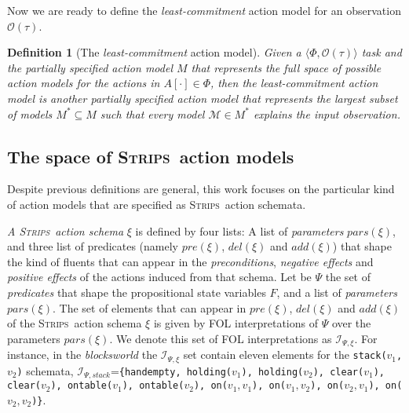 \documentclass{article}
\newcommand{\tup}[1]{{\langle #1 \rangle}}
\newcommand{\strips}{\textsc{Strips}}
\newtheorem{definition}[theorem]{Definition}
\begin{document}
Now we are ready to define the {\em least-commitment} action model for an observation $\mathcal{O}(\tau)$.
\begin{definition}[The {\em least-commitment} action model]
Given a $\tup{\Phi,\mathcal{O}(\tau)}$ task and the {\em partially specified action model} $M$ that represents the full space of possible action models for the actions in $A[\cdot]\in \Phi$, then the {\em least-commitment} action model is another {\em partially specified action model} that represents the largest subset of models $M^*\subseteq M$ such that every model $\mathcal{M}\in M^*$ {\em explains} the input observation.
\end{definition}

\subsection{The space of \strips\ action models}
Despite previous definitions are general, this work focuses on the particular kind of action models that are specified as \strips\ action schemata. 

{\em A \strips\ action schema} $\xi$ is defined by four lists: A list of {\em parameters} $pars(\xi)$, and three list of predicates (namely $pre(\xi)$, $del(\xi)$ and $add(\xi)$) that shape the kind of fluents that can appear in the {\em preconditions}, {\em negative effects} and {\em positive effects} of the actions induced from that schema. Let be $\Psi$ the set of {\em predicates} that shape the propositional state variables $F$, and a list of {\em parameters} $pars(\xi)$. The set of elements that can appear in $pre(\xi)$, $del(\xi)$ and $add(\xi)$ of the \strips\ action schema $\xi$ is given by FOL interpretations of $\Psi$ over the parameters $pars(\xi)$. We denote this set of FOL interpretations as ${\mathcal I}_{\Psi,\xi}$. For instance, in the {\em blocksworld} the ${\mathcal I}_{\Psi,\xi}$ set contain eleven elements for the {\small \tt stack($v_1$,$v_2$)} schemata, ${\mathcal I}_{\Psi,stack}$={\small\tt\{handempty, holding($v_1$), holding($v_2$), clear($v_1$), clear($v_2$), ontable($v_1$), ontable($v_2$), on($v_1,v_1$), on($v_1,v_2$), on($v_2,v_1$), on($v_2,v_2$)\}}. 
\end{document}
